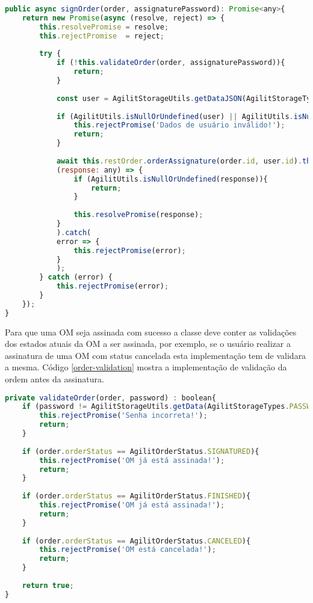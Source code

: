\begin{lstlisting}[language=JavaScript, caption={Assinar a ordem de manutenção}, label={sign-order-mobile}]
public async signOrder(order, assignaturePassword): Promise<any>{
	return new Promise(async (resolve, reject) => {
		this.resolvePromise = resolve;
		this.rejectPromise  = reject;
		
		try {
			if (!this.validateOrder(order, assignaturePassword)){
				return;
			}        
			
			const user = AgilitStorageUtils.getDataJSON(AgilitStorageTypes.USERDATA);
			
			if (AgilitUtils.isNullOrUndefined(user) || AgilitUtils.isNullOrUndefined(user.id) || user.id == ''){
				this.rejectPromise('Dados de usuário inválido!');
				return;
			}
			
			await this.restOrder.orderAssignature(order.id, user.id).then(
			(response: any) => {
				if (AgilitUtils.isNullOrUndefined(response)){
					return;
				}
				
				this.resolvePromise(response);
			}
			).catch(
			error => {
				this.rejectPromise(error);
			}
			);
		} catch (error) {
			this.rejectPromise(error);
		}
	});
}
\end{lstlisting}

Para que uma OM seja assinada com sucesso a classe deve conter as validações dos estados atuais da OM a ser assinada, por exemplo, se o usuário realizar a assinatura de uma OM com status cancelada esta implementação tem de validara a mesma.
Código \ref{order-validation} mostra a implementação de validação da ordem antes da assinatura.

\begin{lstlisting}[language=JavaScript, caption={Validar estados da OM}]
private validateOrder(order, password) : boolean{
	if (password != AgilitStorageUtils.getData(AgilitStorageTypes.PASSWORD)){
		this.rejectPromise('Senha incorreta!');
		return;
	}
	
	if (order.orderStatus == AgilitOrderStatus.SIGNATURED){
		this.rejectPromise('OM já está assinada!');
		return;
	}
	
	if (order.orderStatus == AgilitOrderStatus.FINISHED){
		this.rejectPromise('OM já está assinada!');
		return;
	}
	
	if (order.orderStatus == AgilitOrderStatus.CANCELED){      
		this.rejectPromise('OM está cancelada!');
		return;
	}
	
	return true;
}
\end{lstlisting}

